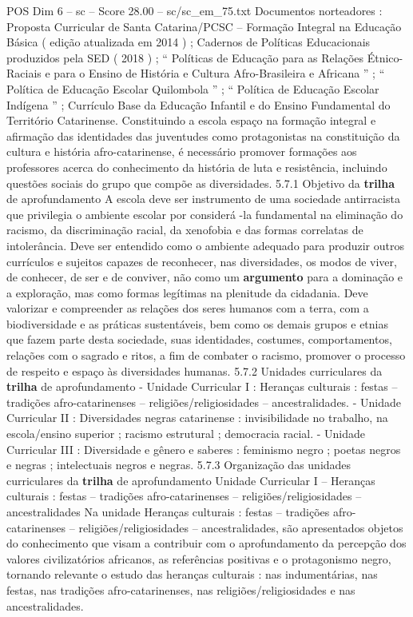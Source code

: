\begin{textsample}{POS Dim 6 – sc – Score 28.00 – sc/sc\_em\_75.txt}
Documentos norteadores : Proposta Curricular de Santa Catarina/PCSC – Formação Integral na Educação Básica ( edição atualizada em 2014 ) ; Cadernos de Políticas Educacionais produzidos pela SED ( 2018 ) ; “ Políticas de Educação para as Relações Étnico-Raciais e para o Ensino de História e Cultura Afro-Brasileira e Africana ” ; “ Política de Educação Escolar Quilombola ” ; “ Política de Educação Escolar Indígena ” ; Currículo Base da Educação Infantil e do Ensino Fundamental do Território Catarinense.
Constituindo a escola espaço na formação integral e afirmação das identidades das juventudes como protagonistas na constituição da cultura e história afro-catarinense, é necessário promover formações aos professores acerca do conhecimento da história de luta e resistência, incluindo questões sociais do grupo que compõe as diversidades. 5.7.1 Objetivo da \textbf{trilha} de aprofundamento A escola deve ser instrumento de uma sociedade antirracista que privilegia o ambiente escolar por considerá -la fundamental na eliminação do racismo, da discriminação racial, da xenofobia e das formas correlatas de intolerância.
Deve ser entendido como o ambiente adequado para produzir outros currículos e sujeitos capazes de reconhecer, nas diversidades, os modos de viver, de conhecer, de ser e de conviver, não como um \textbf{argumento} para a dominação e a exploração, mas como formas legítimas na plenitude da cidadania.
Deve valorizar e compreender as relações dos seres humanos com a terra, com a biodiversidade e as práticas sustentáveis, bem como os demais grupos e etnias que fazem parte desta sociedade, suas identidades, costumes, comportamentos, relações com o sagrado e ritos, a fim de combater o racismo, promover o processo de respeito e espaço às diversidades humanas. 5.7.2 Unidades curriculares da \textbf{trilha} de aprofundamento - Unidade Curricular I : Heranças culturais : festas – tradições afro-catarinenses – religiões/religiosidades – ancestralidades. - Unidade Curricular II : Diversidades negras catarinense : invisibilidade no trabalho, na escola/ensino superior ; racismo estrutural ; democracia racial. - Unidade Curricular III : Diversidade e gênero e saberes : feminismo negro ; poetas negros e negras ; intelectuais negros e negras. 5.7.3 Organização das unidades curriculares da \textbf{trilha} de aprofundamento Unidade Curricular I – Heranças culturais : festas – tradições afro-catarinenses – religiões/religiosidades – ancestralidades Na unidade Heranças culturais : festas – tradições afro-catarinenses – religiões/religiosidades – ancestralidades, são apresentados objetos do conhecimento que visam a contribuir com o aprofundamento da percepção dos valores civilizatórios africanos, as referências positivas e o protagonismo negro, tornando relevante o estudo das heranças culturais : nas indumentárias, nas festas, nas tradições afro-catarinenses, nas religiões/religiosidades e nas ancestralidades.

\end{textsample}
